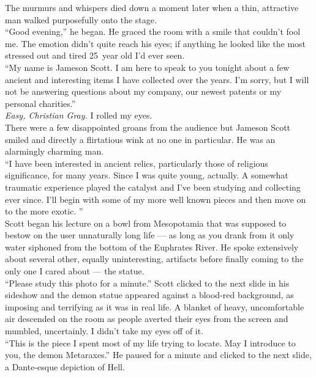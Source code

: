 \documentclass[a5paper]{scrartcl}
\begin{document}
The murmurs and whispers died down a moment later when a thin, attractive man walked purposefully onto the stage.\\


\enquote{Good evening,} he began. He graced the room with a smile that couldn't fool me. The emotion didn't quite reach his eyes; if anything he looked like the most stressed out and tired 25~year old I'd ever seen.\\


\enquote{My name is Jameson Scott. I am here to speak to you tonight about a few ancient and interesting items I have collected over the years. I'm sorry, but I will not be answering questions about my company, our newest patents or my personal charities.}\\


\textit{Easy, Christian Gray.}
 I rolled my eyes.\\


There were a few disappointed groans from the audience but Jameson Scott smiled and directly a flirtatious wink at no one in particular. He was an alarmingly charming man.\\


\enquote{I have been interested in ancient relics, particularly those of religious significance, for many years. Since I was quite young, actually. A somewhat traumatic experience played the catalyst and I've been studying and collecting ever since. I'll begin with some of my more well known pieces and then move on to the more exotic. }\\


Scott began his lecture on a bowl from Mesopotamia that was supposed to bestow on the user unnaturally long life --- as long as you drank from it only water siphoned from the bottom of the Euphrates River. He spoke extensively about several other, equally uninteresting, artifacts before finally coming to the only one I cared about --- the statue.\\


\enquote{Please study this photo for a minute.} Scott clicked to the next slide in his sideshow and the demon statue appeared against a blood-red background, as imposing and terrifying as it was in real life. A blanket of heavy, uncomfortable air descended on the room as people averted their eyes from the screen and mumbled, uncertainly. I didn't take my eyes off of it.\\


\enquote{This is the piece I spent most of my life trying to locate. May I introduce to you, the demon Metaraxes.} He paused for a minute and clicked to the next slide, a Dante-esque depiction of Hell. \\
\end{document}
